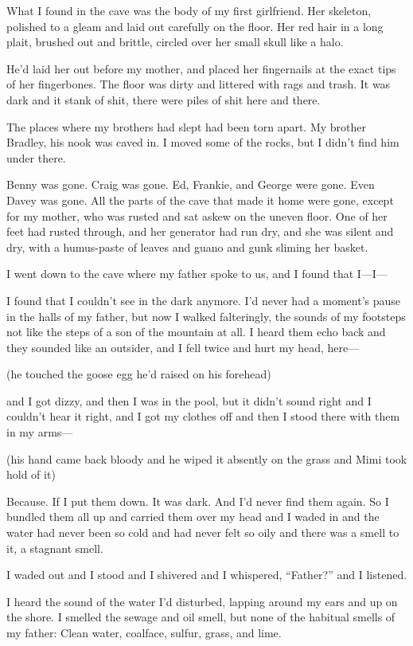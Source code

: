 \documentclass{article}
\begin{document}
What I found in the cave was the body of my first girlfriend.  Her
skeleton, polished to a gleam and laid out carefully on the floor. 
Her red hair in a long plait, brushed out and brittle, circled over
her small skull like a halo.

He'd laid her out before my mother, and placed her fingernails at the
exact tips of her fingerbones.  The floor was dirty and littered with
rags and trash.  It was dark and it stank of shit, there were piles of
shit here and there.

The places where my brothers had slept had been torn apart.  My
brother Bradley, his nook was caved in.  I moved some of the rocks,
but I didn't find him under there.

Benny was gone.  Craig was gone.  Ed, Frankie, and George were gone. 
Even Davey was gone.  All the parts of the cave that made it home were
gone, except for my mother, who was rusted and sat askew on the uneven
floor.  One of her feet had rusted through, and her generator had run
dry, and she was silent and dry, with a humus-paste of leaves and
guano and gunk sliming her basket.

I went down to the cave where my father spoke to us, and I found that
I---I---

I found that I couldn't see in the dark anymore.  I'd never had a
moment's pause in the halls of my father, but now I walked
falteringly, the sounds of my footsteps not like the steps of a son of
the mountain at all.  I heard them echo back and they sounded like an
outsider, and I fell twice and hurt my head, here---

(he touched the goose egg he'd raised on his forehead)

and I got dizzy, and then I was in the pool, but it didn't sound right
and I couldn't hear it right, and I got my clothes off and then I
stood there with them in my arms---

(his hand came back bloody and he wiped it absently on the grass and
Mimi took hold of it)

Because.  If I put them down.  It was dark.  And I'd never find them
again.  So I bundled them all up and carried them over my head and I
waded in and the water had never been so cold and had never felt so
oily and there was a smell to it, a stagnant smell.

I waded out and I stood and I shivered and I whispered, ``Father?''
and I listened.

I heard the sound of the water I'd disturbed, lapping around my ears
and up on the shore.  I smelled the sewage and oil smell, but none of
the habitual smells of my father:  Clean water, coalface, sulfur,
grass, and lime.
\end{document}

